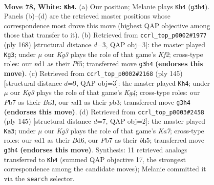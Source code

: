 \documentclass[11pt]{article}
\begin{document}
\clearpage

\begin{figure}[p]\centering
\begin{subfigure}{0.46\textwidth}\centering
\resizebox{\linewidth}{!}{%
\newchessgame
\chessboard[
  setfen={6k1/1P6/P3b3/8/8/6K1/8/3n4 w - - 1 78},
  showmover=false,
  pgfstyle=straightmove, color=movearrow, markmove={g3-h4}
]}
\caption{}
\end{subfigure}\hfill
\begin{subfigure}{0.46\textwidth}\centering
\resizebox{\linewidth}{!}{%
\newchessgame
\chessboard[
  setfen={7k/8/5b1p/5P2/6P1/8/5K2/8 w - - 10 85},
  showmover=false,
  pgfstyle=straightmove, color=movearrow, markmove={f2-g3}
]}
\caption{}
\end{subfigure}
\\[4pt]
\begin{subfigure}{0.46\textwidth}\centering
\resizebox{\linewidth}{!}{%
\newchessgame
\chessboard[
  setfen={8/8/8/6k1/1p6/bP5B/8/5K2 b - - 9 73},
  showmover=false,
  pgfstyle=straightmove, color=movearrow, markmove={g5-h4}
]}
\caption{}
\end{subfigure}\hfill
\begin{subfigure}{0.46\textwidth}\centering
\resizebox{\linewidth}{!}{%
\newchessgame
\chessboard[
  setfen={8/8/3b1B1p/7B/8/2K5/k7/8 b - - 38 73},
  showmover=false,
  pgfstyle=straightmove, color=movearrow, markmove={a2-a3}
]}
\caption{}
\end{subfigure}
\caption{\textbf{Move 78, White: \texttt{Kh4}.} (a) Our position; Melanie plays \texttt{Kh4} (\texttt{g3h4}). Panels (b)--(d) are the retrieved master positions whose correspondence most drove this move (highest QAP objective among those that transfer to it). (b) Retrieved from \texttt{ccrl\_top\_p0002\#1977} (ply 168) [structural distance $d$=3, QAP obj=3]: the master played \texttt{Kg3}; under $\mu$ our \emph{Kg3} plays the role of that game's \emph{Kf2}; cross-type roles: our \emph{n}d1 as their \emph{P}f5; transferred move \texttt{g3h4} \textbf{(endorses this move)}. (c) Retrieved from \texttt{ccrl\_top\_p0002\#2168} (ply 145) [structural distance $d$=9, QAP obj=3]: the master played \texttt{Kh4}; under $\mu$ our \emph{Kg3} plays the role of that game's \emph{Kg4}; cross-type roles: our \emph{P}b7 as their \emph{B}a3, our \emph{n}d1 as their \emph{p}b3; transferred move \texttt{g3h4} \textbf{(endorses this move)}. (d) Retrieved from \texttt{ccrl\_top\_p0003\#2458} (ply 145) [structural distance $d$=7, QAP obj=2]: the master played \texttt{Ka3}; under $\mu$ our \emph{Kg3} plays the role of that game's \emph{Ka7}; cross-type roles: our \emph{n}d1 as their \emph{B}d6, our \emph{P}b7 as their \emph{b}h5; transferred move \texttt{g3h4} \textbf{(endorses this move)}. Synthesis: 11 retrieved analogs transferred to \texttt{Kh4} (summed QAP objective 17, the strongest correspondence among the candidate moves); Melanie committed it via the \texttt{search} selector.}
\label{fig:thought-m154}
\end{figure}
\end{document}
